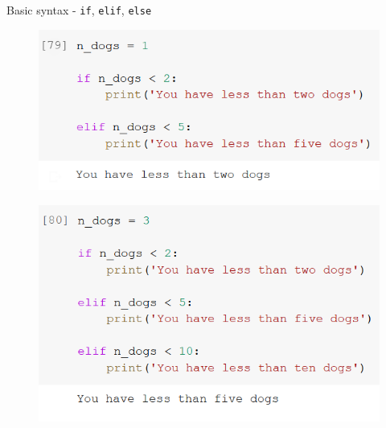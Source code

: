 \documentclass[aspectratio=169]{beamer}
\begin{document}
\begin{frame}{Basic syntax - \texttt{if}, \texttt{elif}, \texttt{else}}
\begin{multicols}{2}
		\begin{figure}
			\centering
			\includegraphics[width=\linewidth]{img/if_and_elif_true.png}
		\end{figure}
		\begin{figure}
			\centering
			\includegraphics[width=\linewidth]{img/elif_and_elif_true.png}
		\end{figure}

	\end{multicols}

\end{frame}
\end{document}
